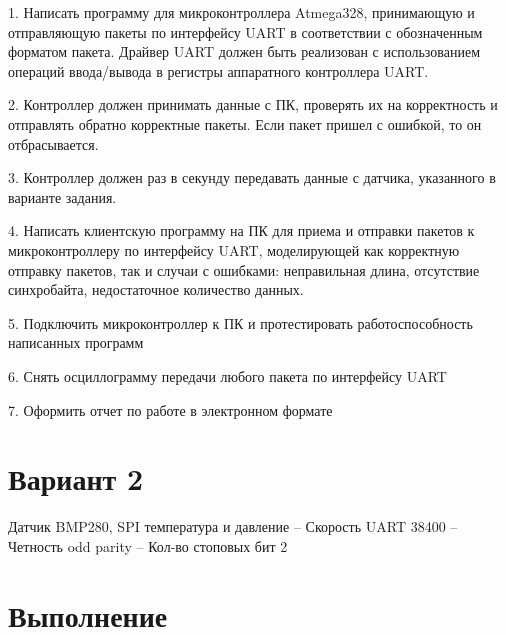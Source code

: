 \documentclass{article}
\begin{document}
1. Написать программу для микроконтроллера Atmega328, принимающую и отправляющую
пакеты по интерфейсу UART в соответствии с обозначенным форматом пакета. Драйвер UART
должен быть реализован с использованием операций ввода/вывода в регистры аппаратного
контроллера UART.

2. Контроллер должен принимать данные с ПК, проверять их на корректность и отправлять
обратно корректные пакеты. Если пакет пришел с ошибкой, то он отбрасывается.

3. Контроллер должен раз в секунду передавать данные с датчика, указанного в варианте
задания.

4. Написать клиентскую программу на ПК для приема и отправки пакетов к микроконтроллеру
по интерфейсу UART, моделирующей как корректную отправку пакетов, так и случаи с
ошибками: неправильная длина, отсутствие синхробайта, недостаточное количество данных.

5. Подключить микроконтроллер к ПК и протестировать работоспособность написанных
программ

6. Снять осциллограмму передачи любого пакета по интерфейсу UART

7. Оформить отчет по работе в электронном формате

\section{Вариант 2}

Датчик BMP280, SPI температура и давление -- Скорость UART 38400 -- Четность odd parity -- Кол-во
стоповых бит 2

\section{Выполнение}
\end{document}
